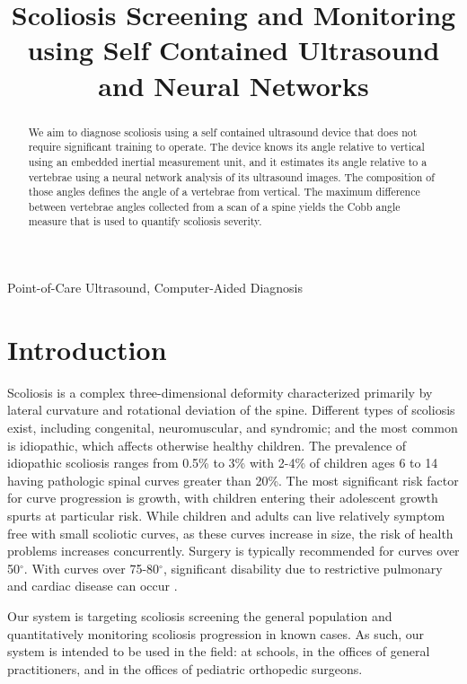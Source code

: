 \documentclass{article}
\title{Scoliosis Screening and Monitoring using Self Contained Ultrasound and Neural Networks}
\begin{document}
%
\maketitle
%
\begin{abstract}
We aim to diagnose scoliosis using a self contained ultrasound device that does not require significant training to operate. The device knows its angle relative to vertical using an embedded inertial measurement unit, and it estimates its angle relative to a vertebrae using a neural network analysis of its ultrasound images.  The composition of those angles defines the angle of a vertebrae from vertical.  The maximum difference between vertebrae angles collected from a scan of a spine yields the Cobb angle measure that is used to quantify scoliosis severity. 
\end{abstract}
%
\begin{keywords}
Point-of-Care Ultrasound, Computer-Aided Diagnosis
\end{keywords}
%
\section{Introduction}
\label{sec:intro}

Scoliosis is a complex three-dimensional deformity characterized primarily by lateral curvature and rotational deviation of the spine. Different types of scoliosis exist, including congenital, neuromuscular, and syndromic; and the most common is idiopathic, which affects otherwise healthy children. The prevalence of idiopathic scoliosis ranges from 0.5\% to 3\% \cite{Mor06} with 2-4\% of children ages 6 to 14 having pathologic spinal curves greater than 20\%. The most significant risk factor for curve progression is growth, with children entering their adolescent growth spurts at particular risk. While children and adults can live relatively symptom free with small scoliotic curves, as these curves increase in size, the risk of health problems increases concurrently. Surgery is typically recommended for curves over 50$^\circ$. With curves over 75-80$^\circ$, significant disability due to restrictive pulmonary and cardiac disease can occur \cite{Hae06}.

Our system is targeting scoliosis screening the general population and quantitatively monitoring scoliosis progression in known cases. As such, our system is intended to be used in the field: at schools, in the offices of general practitioners, and in the offices of pediatric orthopedic surgeons.
\end{document}
